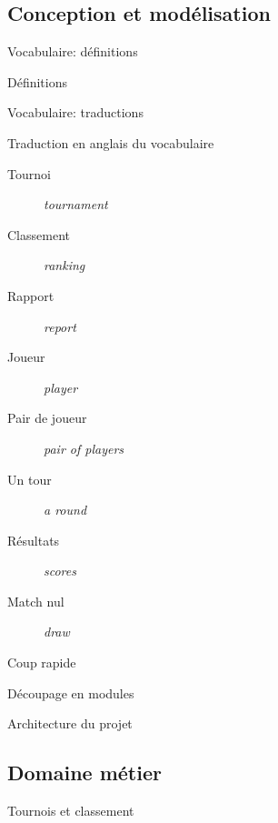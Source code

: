\subsection{Conception et modélisation}

\begin{frame}{Vocabulaire: définitions}
  \begin{block}{Définitions}
    \begin{description}
      \item[]
    \end{description}
  \end{block}
\end{frame}

\begin{frame}{Vocabulaire: traductions}
  \begin{block}{Traduction en anglais du vocabulaire}
    \begin{description}
    \item[Tournoi] \textit{tournament}
    \item[Classement] \textit{ranking}
    \item[Rapport] \textit{report}
    \item[Joueur] \textit{player}
    \item[Pair de joueur] \textit{pair of players}
    \item[Un tour] \textit{a round}
    \item[Résultats] \textit{scores}
    \item[Match nul] \textit{draw}
    \item[Coup rapide]
    \end{description}
  \end{block}
\end{frame}

\begin{frame}{Découpage en modules}
  
\end{frame}

\begin{frame}{Architecture du projet}
  
\end{frame}

\subsection{Domaine métier}

\begin{frame}{Tournois et classement}
  
\end{frame}


